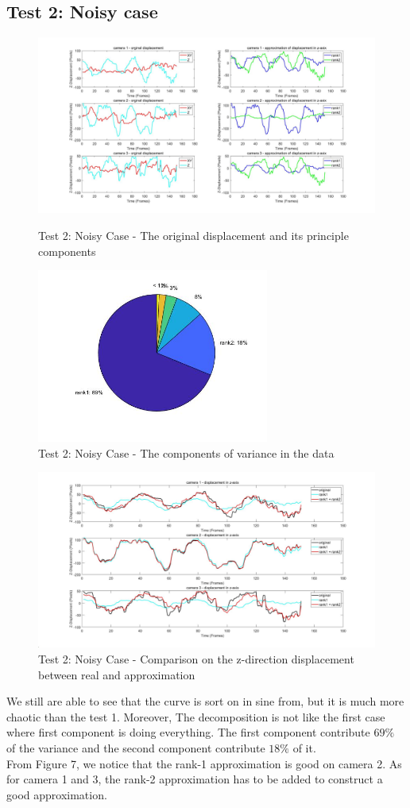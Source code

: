 \documentclass{article}
\begin{document}
\subsection{Test 2: Noisy case}
\begin{figure}[h]
    \centerline{\includegraphics[width=8in]{case21.jpg}}
    \caption{Test 2: Noisy Case - The original displacement and its principle components}
    \centerline{\includegraphics[width=3in]{case22.jpg}}
    \caption{Test 2: Noisy Case - The components of variance in the data}
\end{figure}
\begin{figure}[h]
    \centerline{\includegraphics[width=8in]{case23.jpg}}
    \caption{Test 2: Noisy Case - Comparison on the z-direction displacement between real and approximation}
\end{figure}
We still are able to see that the curve is sort on in sine from, but it is much more chaotic than the test 1. Moreover, The decomposition is not like the first case where first component is doing everything. The first component contribute $69\%$ of the variance and the second component contribute $18\%$ of it.
~\\
From Figure 7, we notice that the rank-1 approximation is good on camera 2. As for camera 1 and 3, the rank-2 approximation has to be added to construct a good approximation.
\end{document}
